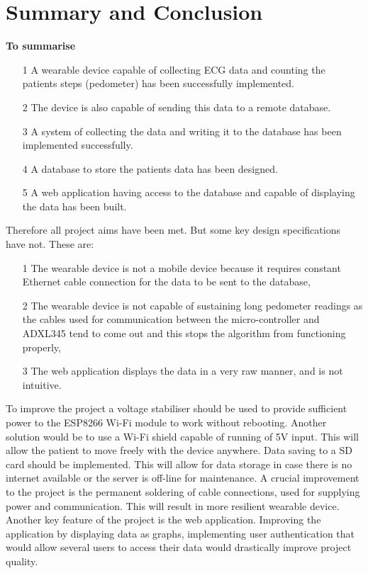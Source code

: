 \documentclass[12pt,]{article}
\numberwithin{figure}{section}
\begin{document}
\section{Summary and Conclusion}
\textbf{To summarise} 
\begin{itemize}
\item[1] A wearable device capable of collecting ECG data and counting the patients steps (pedometer) has been successfully implemented.
\item[2] The device is also capable of sending this data to a remote database.
\item[3] A system of collecting the data and writing it to the database has been implemented successfully.
\item[4] A database to store the patients data has been designed.
\item[5] A web application having access to the database and capable of displaying the data has been built.
\end{itemize}
Therefore all project aims have been met. But some key design specifications have not. These are: 
\begin{itemize}
\item[1] The wearable device is not a mobile device because it requires constant Ethernet cable connection for the data to be sent to the database,
\item[2] The wearable device is not capable of sustaining long pedometer readings as the cables used for communication between the micro-controller and ADXL345 tend to come out and this stops the algorithm from functioning properly,
\item[3] The web application displays the data in a very raw manner, and is not intuitive.
\end{itemize}
To improve the project a voltage stabiliser should be used to provide sufficient power to the ESP8266 Wi-Fi module to work without rebooting. Another solution would be to use a Wi-Fi shield capable of running of 5V input. This will allow the patient to move freely with the device anywhere. Data saving to a SD card should be implemented. This will allow for data storage in case there is no internet available or the server is off-line for maintenance. A crucial improvement to the project is the permanent soldering of cable connections, used for supplying power and communication. This will result in more resilient wearable device. Another key feature of the project is the web application. Improving the application by displaying data as graphs, implementing user authentication that would allow several users to access their data would drastically improve project quality.
\end{document}
